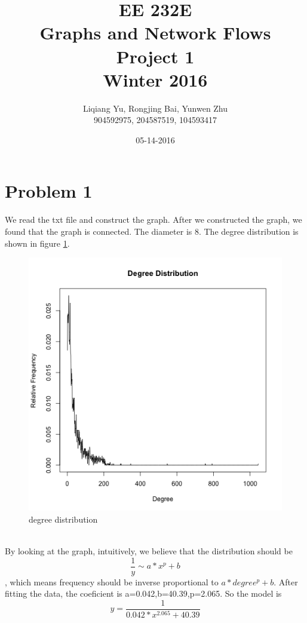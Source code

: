 \documentclass{article}
\begin{document}
\begin{titlepage}
\title{EE 232E \\Graphs and Network Flows\\Project 1\\Winter 2016} 
\author{Liqiang Yu, Rongjing Bai, Yunwen Zhu\\
904592975, 204587519, 104593417}  %
\date{05-14-2016}
\end{titlepage}
\maketitle
\newpage
\tableofcontents
\newpage
\section{Problem 1}
We read the txt file and construct the graph. After we constructed the graph, we found that the graph is connected. The diameter is 8. The degree distribution is shown in figure \ref{fig:p1_1}.
\begin{figure}[htbp]
\centering
\includegraphics[width=.8\textwidth]{1_1.png}
\caption{degree distribution}
\label{fig:p1_1}
\end{figure}\\
By looking at the graph, intuitively, we believe that the distribution should be $$\frac{1}{y} \sim a*x^{p}+b$$, which means frequency should be inverse proportional  to $a*degree^{p}+b$. After fitting the data, the coeficient is a=0.042,b=40.39,p=2.065. So the model is $$y=\frac{1}{0.042*x^{2.065}+40.39}$$
\end{document}
